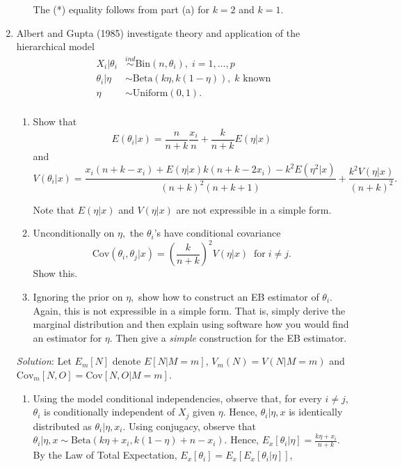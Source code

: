 \documentclass[11pt]{article}
\begin{document}
\begin{enumerate}
\begin{enumerate}
	The (*) equality follows from part (a) for $k=2$ and $k=1$. 
	
\end{enumerate}


\item Albert and Gupta (1985) investigate theory and application of the hierarchical model 
\begin{align*}
X_i| \theta_i &\stackrel{ind}{\sim} \text{Bin}(n, \theta_i),\; i=1,\ldots,p\\
\theta_i|\eta &\sim \text{Beta}(k\eta,k(1-\eta)),\;k \text{ known}\\
\eta &\sim \text{Uniform}(0,1).\\
\end{align*}

\begin{enumerate}
\item Show that 
$$E(\theta_i|x) = \dfrac{n}{n +k}\dfrac{x_i}{n} + \dfrac{k}{n +k}E(\eta|x)$$ and 
$$V(\theta_i|x) = \frac{x_i(n+k - x_i) + E(\eta|x)k(n+k - 2 x_i) - k^2E(\eta^2|x)}{(n+k)^2(n+k+1)}
+ \frac{k^2V(\eta|x)}{(n+k)^2}.
$$

Note that $E(\eta|x)$ and $V(\eta|x)$ are not expressible in a simple form. 
\item Unconditionally on $\eta,$ the $\theta_i$'s have conditional covariance 
$$\text{Cov}(\theta_i,\theta_j|x) = \left(\frac{k}{n+k}\right)^2V(\eta|x)\; \;\text{for} \; i\neq j.$$
Show this. 
\item Ignoring the prior on $\eta,$ show how to construct an EB estimator of $\theta_i.$ Again, this is not expressible in a simple form. That is, simply derive the marginal distribution and then explain using software how you would find an estimator for $\eta.$ Then give a \emph{simple} construction for the EB estimator. 
\end{enumerate}

\emph{Solution}: Let $E_{m}[N]$ denote $E[N|M=m]$, $V_{m}(N) = V(N|M=m)$ and $\text{Cov}_{m}[N,O] = \text{Cov}[N,O|M=m]$.

\begin{enumerate}
	\item Using the model conditional independencies, observe that, for every $i \neq j$, $\theta_{i}$ is conditionally independent of $X_{j}$ given $\eta$. Hence, $\theta_{i}|\eta,x$ is identically distributed as $\theta_{i}|\eta,x_{i}$. Using conjugacy, observe that $\theta_{i}|\eta,x \sim \text{Beta}(k\eta+x_{i},k(1-\eta)+n-x_{i})$. Hence, $E_{x}[\theta_{i}|\eta] = \frac{k\eta + x_{i}}{n+k}$. By the Law of Total Expectation, $E_{x}[\theta_{i}] = E_{x}[E_{x}[\theta_{i}|\eta]]$, 


\end{enumerate}
\end{enumerate}
\end{document}
